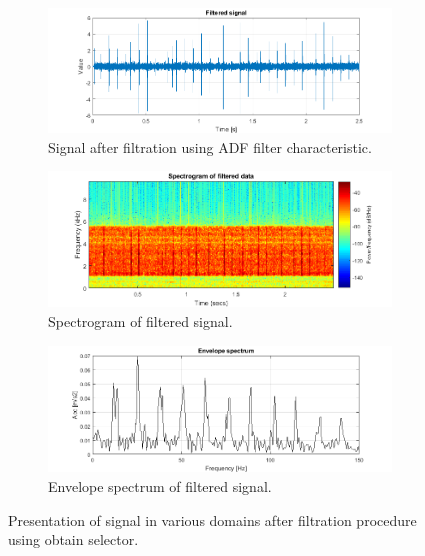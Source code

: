 \documentclass[11pt]{article}
\begin{document}
\begin{figure}[!ht]
  \centering
  \begin{subfigure}[b]{0.7\textwidth}
      \centering
\includegraphics[width=\textwidth]{filtered_signal_2.png}
\caption{Signal after filtration using ADF filter characteristic. \label{f:filtered}}
  \end{subfigure}
  \begin{subfigure}[b]{0.7\textwidth}
      \centering
\includegraphics[width=\textwidth]{spec2_1.png}
\caption{Spectrogram of filtered signal. \label{f:spec_filtered}}
  \end{subfigure}
  
    \begin{subfigure}[b]{0.7\textwidth}
      \centering
\includegraphics[width=\textwidth]{envelope_2.png}
\caption{Envelope spectrum of filtered signal. \label{f:envelope}}
  \end{subfigure}
  \caption{Presentation of signal in various domains after filtration procedure using obtain selector.}
  \label{fig:fig_razem}
\end{figure}
\end{document}
